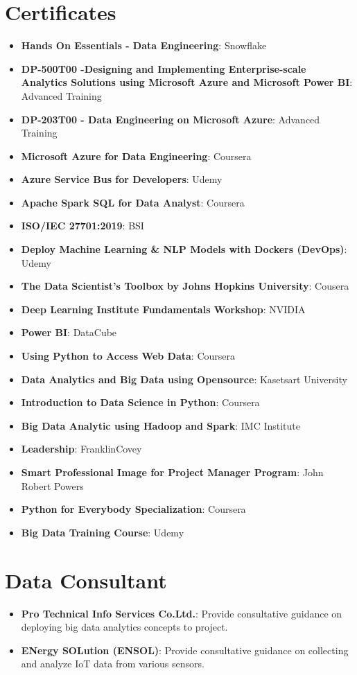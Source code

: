 \documentclass[letterpaper,11pt]{article}
\newcommand{\resumeItem}[2]{
  \item\small{
    \textbf{#1}{: #2 \vspace{-2pt}}
  }
}
\newcommand{\resumeSubItem}[2]{\resumeItem{#1}{#2}\vspace{-4pt}}
\newcommand{\resumeSubHeadingListStart}{\begin{itemize}[leftmargin=*]}
\newcommand{\resumeSubHeadingListEnd}{\end{itemize}}
\begin{document}
\begin{refsection}
	\nocite{Kerdsri2018}
  \nocite{7886152}
  \nocite{7332543}
  \nocite{Kerdsri2012}
  \nocite{6427357}
  \nocite{6174610}
  \nocite{waset2010}
	\AtNextBibliography{\small}
	\printbibliography[title={Conference Proceedings}]
\end{refsection}

\begin{refsection}
  \nocite{book2013}
  \nocite{book2013a}
  \nocite{book2012}
  \nocite{book2012a}
  \nocite{book2012b}
  \nocite{book2007}
  \nocite{kerdsri2003snmp}
	\AtNextBibliography{\small}
	\printbibliography[title={Books}]
\end{refsection}

\section{Certificates}
  \resumeSubHeadingListStart
  \resumeSubItem{Hands On Essentials - Data Engineering}{Snowflake}
  \resumeSubItem{DP-500T00 -Designing and Implementing Enterprise-scale Analytics Solutions using Microsoft Azure and Microsoft Power BI}{Advanced Training}
  \resumeSubItem{DP-203T00 - Data Engineering on Microsoft Azure}{Advanced Training}
  \resumeSubItem{Microsoft Azure for Data Engineering}{Coursera}
  \resumeSubItem{Azure Service Bus for Developers}{Udemy}
  \resumeSubItem{Apache Spark SQL for Data Analyst}{Coursera}
  \resumeSubItem{ISO/IEC 27701:2019}{BSI}
  \resumeSubItem{Deploy Machine Learning \& NLP Models with Dockers (DevOps)}{Udemy}
  \resumeSubItem{The Data Scientist’s Toolbox by Johns Hopkins University}{Cousera}
  \resumeSubItem{Deep Learning Institute Fundamentals Workshop}{NVIDIA}
  \resumeSubItem{Power BI}{DataCube}
  \resumeSubItem{Using Python to Access Web Data}{Coursera}  
  \resumeSubItem{Data Analytics and Big Data using Opensource}{Kasetsart University}
  \resumeSubItem{Introduction to Data Science in Python}{Coursera}   
  \resumeSubItem{Big Data Analytic using Hadoop and Spark}{IMC Institute}
  \resumeSubItem{Leadership}{FranklinCovey}
  \resumeSubItem{Smart Professional Image for Project Manager Program}{John Robert Powers}
  \resumeSubItem{Python for Everybody Specialization}{Coursera}
  \resumeSubItem{Big Data Training Course}{Udemy}         
  \resumeSubHeadingListEnd


  \section{Data Consultant}
  \resumeSubHeadingListStart
  \resumeSubItem{Pro Technical Info Services Co.Ltd.}{Provide consultative guidance on deploying big data analytics concepts to project.}
  \resumeSubItem{ENergy SOLution (ENSOL)}{Provide consultative guidance on collecting and analyze IoT data from various sensors.}     
  \resumeSubHeadingListEnd
\end{document}
